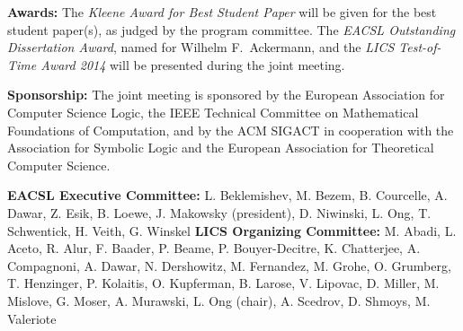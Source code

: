 \documentclass[oneside]{article}
\begin{document}
{\begin{minipage}[t]{\rightcol}
  \noindent%
  \textbf{Awards:} %
  The \emph{Kleene Award for Best Student Paper} will be given for the best
  student paper(s), as judged by the program committee.
  The \emph{EACSL Outstanding Dissertation Award}, named for Wilhelm F.\
  Ackermann,
  and the \emph{LICS Test-of-Time Award 2014}
  will be presented during the joint meeting.

  \medskip

%

  \noindent%
  \textbf{Sponsorship:} %
  The joint meeting is sponsored by the European Association for Computer
  Science Logic, the IEEE Technical Committee on Mathematical Foundations of
  Computation, and by the ACM SIGACT in cooperation with the Association for
  Symbolic Logic and the European Association for Theoretical Computer Science.

\end{minipage}
}

\medskip

 \noindent%
\bgroup \small
  \textbf{EACSL Executive Committee:}
L. Beklemishev, M. Bezem, B. Courcelle, A. Dawar, Z. Esik, B. Loewe,
J. Makowsky (president), D. Niwinski, L. Ong, T. Schwentick, H. Veith,
G. Winskel
%
\quad  \textbf{LICS Organizing Committee:}
M. Abadi, L. Aceto, R. Alur, F. Baader, P. Beame, P. Bouyer-Decitre,
K. Chatterjee, A. Compagnoni, A. Dawar, N. Dershowitz, M. Fernandez,
M. Grohe, O. Grumberg, T. Henzinger, P. Kolaitis, O. Kupferman,
B. Larose, V. Lipovac, D. Miller, M. Mislove, G. Moser, A. Murawski, L. Ong
(chair), A. Scedrov, D. Shmoys, M. Valeriote
\egroup
\end{document}
